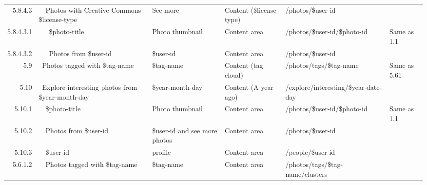 \documentclass[12pt,a4paper]{article}
\begin{document}
\begin{landscape}
\begin{table}[h!b!p!]
\begin{center}
\begin{tiny}
\begin{tabular}{r|l|l|l|l|p{3cm}}
                    5.8.4.3 &
                    ~~Photos with Creative Commons \$license-type &
                    See more &
                    Content (\$license-type) &
                    /photos/\$user-id &
                    \\

                      5.8.4.3.1 &
                      ~~~\$photo-title &
                      Photo thumbnail &
                      Content area &
                      /photos/\$user-id/\$photo-id &
                      Same as 1.1 \\

                      5.8.4.3.2 &
                      ~~~Photos from \$user-id &
                      \$user-id &
                      Content area &
                      /photos/\$user-id &
                      \\

              5.9 &
              ~Photos tagged with \$tag-name &
              \$tag-name &
              Content (tag cloud) &
              /photos/tags/\$tag-name &
              Same as 5.61\\


              5.10 &
              ~Explore interesting photos from \$year-month-day &
              \$year-month-day &
              Content (A year ago) &
              /explore/interesting/\$year-date-day &
              \\

                5.10.1 &
                ~~\$photo-title &
                Photo thumbnail &
                Content area &
                /photos/\$user-id/\$photo-id &
                Same as 1.1 \\

                5.10.2 &
                ~~Photos from \$user-id &
                \$user-id and see more photos &
                Content area &
                /photos/\$user-id &
                \\

                5.10.3 &
                ~~\$user-id &
                profile &
                Content area &
                /people/\$user-id &
                \\

                5.6.1.2 &
                ~~Photos tagged with \$tag-name &
                \$tag-name &
                Content area &
                /photos/tags/\$tag-name/clusters &
                \\


\end{tabular}
\end{tiny}
\end{center}
\end{table}
\end{landscape}
\end{document}
